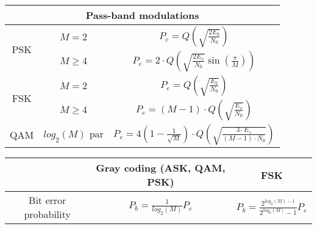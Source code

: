 \documentclass[en]{article}
\begin{document}
\begin{center}
    \renewcommand{\arraystretch}{2.2}
        \begin{tabular}{|c|c|c|}
            \multicolumn{3}{c}{{\bf Pass-band modulations}}\\
            \hline
            \multirow{2}{*}{PSK} & $M=2$ & $P_e = Q\left ( \sqrt{\displaystyle\frac{2 E_b}{N_0}} \right)$ \\
            \cline{2-3}
            & $M \geq 4$ & $P_e = 2 \cdot Q\left ( \sqrt{\displaystyle\frac{2 E_s}{N_0}} \sin\left ( \displaystyle\frac{\pi}{M} \right)  \right)$ \\
            \hline
            \multirow{2}{*}{FSK} & $M=2$ & $P_e = Q\left ( \sqrt{\displaystyle\frac{E_b}{N_0}} \right)$ \\
            \cline{2-3}
            & $M\geq 4$ & $P_e = (M-1) \cdot Q\left ( \sqrt{\displaystyle\frac{E_s}{N_0}} \right)$ \\
            \hline
            QAM & $log_2(M)$ par & $P_e = 4 \left ( 1 - \displaystyle\frac{1}{\sqrt{M}} \right ) \cdot Q\left ( \sqrt{\displaystyle\frac{3 \cdot E_s}{(M-1) \cdot N_0}} \right)$ \\
            \hline
        \end{tabular}
        \renewcommand{\arraystretch}{1}
        \vspace{0.5cm}

       
        \renewcommand{\arraystretch}{1.5}
        \begin{tabular}{|c|c|c|}
            \hline
            & Gray coding (ASK, QAM, PSK) & FSK \\ 
            \hline
            Bit error probability & $P_b = \displaystyle\frac{1}{log_2(M)} P_e$ & $P_b = \displaystyle\frac{2^{log_2(M)-1}}{2^{log_2(M)}-1} P_e$ \\
            \hline
        \end{tabular}
        \renewcommand{\arraystretch}{1} 
        \vspace{0.5cm}
    

\end{center}
\end{document}
